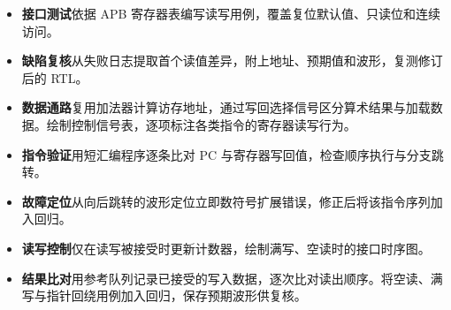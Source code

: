 
\begin{itemize}
  \item \textbf{接口测试}\quad 依据 APB 寄存器表编写读写用例，覆盖复位默认值、只读位和连续访问。
  \item \textbf{缺陷复核}\quad 从失败日志提取首个读值差异，附上地址、预期值和波形，复测修订后的 RTL。
\end{itemize}

\begin{itemize}
  \item \textbf{数据通路}\quad 复用加法器计算访存地址，通过写回选择信号区分算术结果与加载数据。绘制控制信号表，逐项标注各类指令的寄存器读写行为。
  \item \textbf{指令验证}\quad 用短汇编程序逐条比对 PC 与寄存器写回值，检查顺序执行与分支跳转。
  \item \textbf{故障定位}\quad 从向后跳转的波形定位立即数符号扩展错误，修正后将该指令序列加入回归。
\end{itemize}

\begin{itemize}
  \item \textbf{读写控制}\quad 仅在读写被接受时更新计数器，绘制满写、空读时的接口时序图。
  \item \textbf{结果比对}\quad 用参考队列记录已接受的写入数据，逐次比对读出顺序。将空读、满写与指针回绕用例加入回归，保存预期波形供复核。
\end{itemize}

